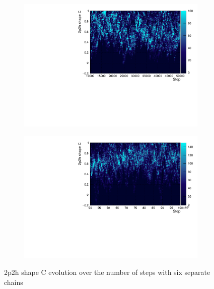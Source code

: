 \begin{figure}[h]
	\begin{subfigure}[t]{0.40\textwidth}
		\includegraphics[width=\textwidth, trim={0mm 0mm 0mm 0mm}, clip,page=1]{figures/mcmc/2p2h_shape_C_step3}
	\end{subfigure}
	\begin{subfigure}[t]{0.40\textwidth}
		\includegraphics[width=\textwidth, trim={0mm 0mm 0mm 0mm}, clip,page=1]{figures/mcmc/2p2h_shape_C_step4}
	\end{subfigure}
	\caption{2p2h shape C evolution over the number of steps with six separate chains}
	\label{fig:2p2h_shape_mcmc}
\end{figure}

